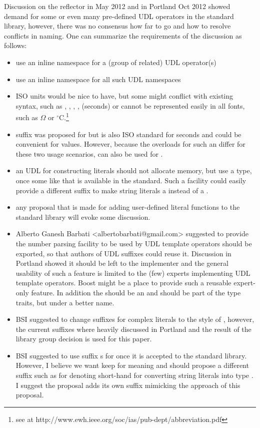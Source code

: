 \documentclass[ebook,11pt,article]{memoir}
\begin{document}
Discussion on the reflector in May 2012 and in Portland Oct 2012 showed demand for some or even many pre-defined UDL operators in the standard library, however, there was no consensus how far to go and how to resolve conflicts in naming. One can summarize the requirements of the discussion as follows:
\begin{itemize}
\item use an inline namespace for a (group of related) UDL operator(s)
\item use an inline namespace  for all such UDL namespaces
\item ISO units would be nice to have, but some might conflict with existing syntax, such as , , , , (seconds) or cannot be represented easily in all fonts, such as $\Omega$ or $^{\circ}\mathrm{C}$.\footnote{see at {http://www.ewh.ieee.org/soc/ias/pub-dept/abbreviation.pdf}}
\item suffix  was proposed for  but is also ISO standard for seconds and could be convenient for  values. However, because the overloads for such an  differ for these two usage scenarios,  can also be used for .
\item an UDL for constructing  literals should not allocate memory, but use a  type, once some like that is available in the standard. Such a facility could easily provide a different suffix to make string literals a  instead of a . 
\item any proposal that is made for adding user-defined literal functions to the standard library will evoke some discussion.
\item Alberto Ganesh Barbati <albertobarbati@gmail.com> suggested to provide the number parsing facility to be used by UDL template operators should be exported, so that authors of UDL suffixes could reuse it. Discussion in Portland showed it should be left to the implementer and the general usability of such a feature is limited to the (few) experts implementing UDL template operators. Boost might be a place to provide such a reusable expert-only feature. In addition the  should be an  and should be part of the type traits, but under a better name.
\item BSI suggested to change suffixes for complex literals to the style of , however, the current suffixes where heavily discussed in Portland and the result of the library group decision is used for this paper.
\item BSI suggested to use suffix s for  once it is accepted to the standard library. However, I believe we want keep  for meaning  and  should propose a different suffix such as  for denoting short-hand for converting string literals into type . I suggest the  proposal adds its own suffix mimicking the approach of this proposal.
\end{itemize}
\end{document}
